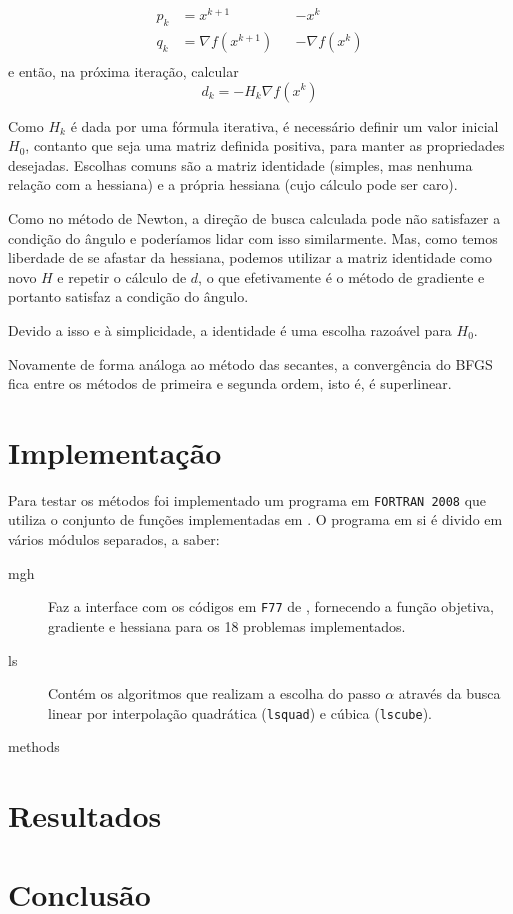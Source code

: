 \documentclass[a4paper,11pt]{article}
\begin{document}
                \begin{equation*}
                    \begin{aligned}
                        p_k &= x^{k+1} & &- x^k \\
                        q_k &= \nabla f(x^{k+1}) & &- \nabla f(x^k) \\
                    \end{aligned}
                \end{equation*}
            e então, na próxima iteração, calcular
                $$ d_k = -H_k\nabla f(x^k) $$

            Como $H_k$ é dada por uma fórmula iterativa, é necessário definir um valor inicial $H_0$, contanto que seja uma matriz definida positiva, para manter as propriedades desejadas. Escolhas comuns são a matriz identidade (simples, mas nenhuma relação com a hessiana) e a própria hessiana (cujo cálculo pode ser caro).

            Como no método de Newton, a direção de busca calculada pode não satisfazer a condição do ângulo e poderíamos lidar com isso similarmente. Mas, como temos liberdade de se afastar da hessiana, podemos utilizar a matriz identidade como novo $H$ e repetir o cálculo de $d$, o que efetivamente é o método de gradiente e portanto satisfaz a condição do ângulo.

            Devido a isso e à simplicidade, a identidade é uma escolha razoável para $H_0$.

            Novamente de forma análoga ao método das secantes, a convergência do BFGS fica entre os métodos de primeira e segunda ordem, isto é, é superlinear.

    \section*{Implementação}
        Para testar os métodos foi implementado um programa em \texttt{FORTRAN 2008} que utiliza o conjunto de  funções implementadas em \citep*{More:1981:AFS:355934.355943}.
        O programa em si é divido em vários módulos separados, a saber:

        \begin{description}
            \item[mgh] Faz a interface com os códigos em \texttt{F77} de \citep*{More:1981:AFS:355934.355943}, fornecendo a função objetiva, gradiente e hessiana para os 18 problemas implementados.
            \item[ls] Contém os algoritmos que realizam a escolha do passo $\alpha$ através da busca linear por interpolação quadrática (\texttt{lsquad}) e cúbica (\texttt{lscube}).
            \item[methods]
            \item[]
            \item[]
            \item[]
            \item[]

        \end{description}
    \section*{Resultados}
    \section*{Conclusão}

    
\end{document}
